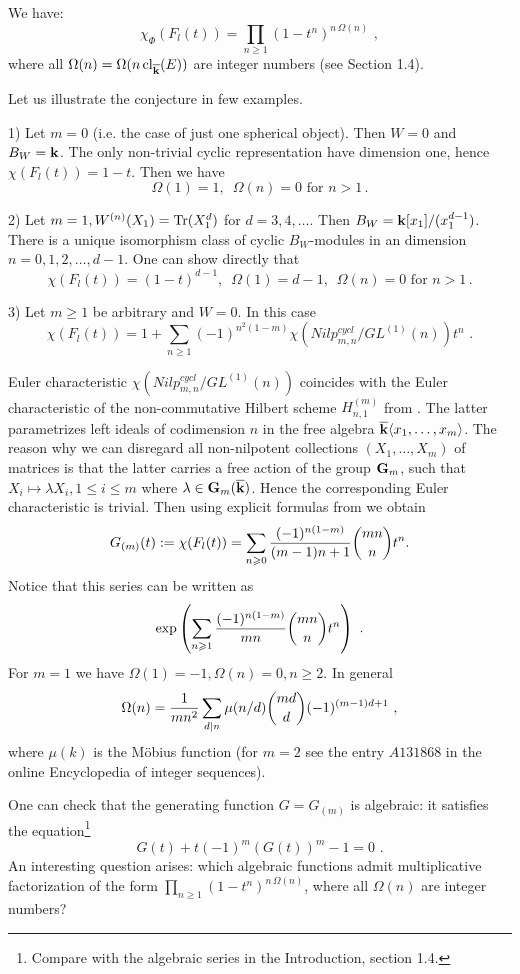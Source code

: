 \documentclass[12pt]{article}
\begin{document}
\begin{conj} We have:
$$\chi_\Phi(F_l(t))=\prod_{n\geqslant 1}(1-t^n)^{n\,\Omega(n)}\,\,,$$
where all $\Omega(n)=\Omega(n\operatorname{cl}_{{\overline{\bf k}}}(E))$ are integer numbers (see Section 1.4).

\end{conj}

Let us illustrate the conjecture in  few examples.

1) Let $m=0$ (i.e. the case of just one spherical object). Then $W=0$ and $B_W={\bf k}$. The only non-trivial cyclic representation have dimension one, hence 
$\chi(F_l(t))=1-t$. Then we have 
$$\Omega(1)=1,\,\,\,\Omega(n)=0\mbox{ for }n>1\,.$$

2) Let $m=1, W^{(n)}(X_1)=\operatorname{Tr}(X_1^d)$ for $d=3,4,\dots$.
Then $B_W={\bf k}[x_1]/(x_1^{d-1})$. There is a unique isomorphism class of cyclic $B_W$-modules in an dimension $n=0,1,2,\dots,d-1$. One can show directly that 
$$\chi(F_l(t))=(1-t)^{d-1},\,\,\, 
\Omega(1)=d-1,\,\,\,\Omega(n)=0\mbox{ for }n>1\,.$$


3) Let $m\ge 1 $ be arbitrary and $W=0$. In this case
$$\chi(F_l(t))=1+\sum_{n\geqslant 1}(-1)^{n^2(1-m)}\chi(Nilp_{m,n}^{cycl}/GL^{(1)}(n))t^n\,\,.$$

Euler characteristic $\chi(Nilp_{m,n}^{cycl}/GL^{(1)}(n))$ coincides with the Euler characteristic of the non-commutative Hilbert scheme $H_{n,1}^{(m)}$ from \cite{Re2}. The latter parametrizes left ideals of codimension $n$ in the free algebra
${\overline{\bf k}}\langle x_1,\dots,x_m\rangle$. The reason why we can disregard all non-nilpotent collections $(X_1,\dots,X_m)$ of  matrices is that the latter carries a free action of the group ${\bf G}_m$, such that $X_i\mapsto \lambda X_i, 1\leqslant i\leqslant m$ where $\lambda\in {\bf G}_m({\overline{\bf k}})$. 
Hence the corresponding Euler characteristic is trivial. Then using explicit formulas from \cite{Re2} we obtain
$$G_{(m)}(t):=\chi(F_l(t))=\sum_{n\geqslant 0}{(-1)^{n(1-m)}\over{(m-1)n+1}}\binom {mn}{n}t^n.$$
Notice that this series can be written
as
$$\exp\left(\sum_{n\geqslant 1}{(-1)^{n(1-m)}\over{mn}}\binom {mn}{n}t^n\right)\,\,.$$
For $m=1$ we have $\Omega(1)=-1, \Omega(n)=0, n\geqslant 2$.
In general
$$\Omega(n)={1\over{mn^2}}\sum_{d|n}\mu({n}/{d})\binom {md}{d}(-1)^{(m-1)d+1}\,\,,$$
where $\mu(k)$ is the M\"obius function (for $m=2$ see the entry $A131868$ in the online Encyclopedia of integer sequences).

\begin{rmk}
One can check that the generating function $G=G_{(m)}$ is algebraic: it satisfies the equation\footnote{Compare with the algebraic series in the Introduction, section 1.4.}
$$G(t)+t(-1)^m(G(t))^m-1=0\,\,.$$
An interesting question arises: which algebraic functions admit multiplicative factorization of the form $\prod_{n\geqslant 1}(1-t^n)^{n\,\Omega(n)}$,
where all $\Omega(n)$ are integer numbers?


\end{rmk}
\end{document}
